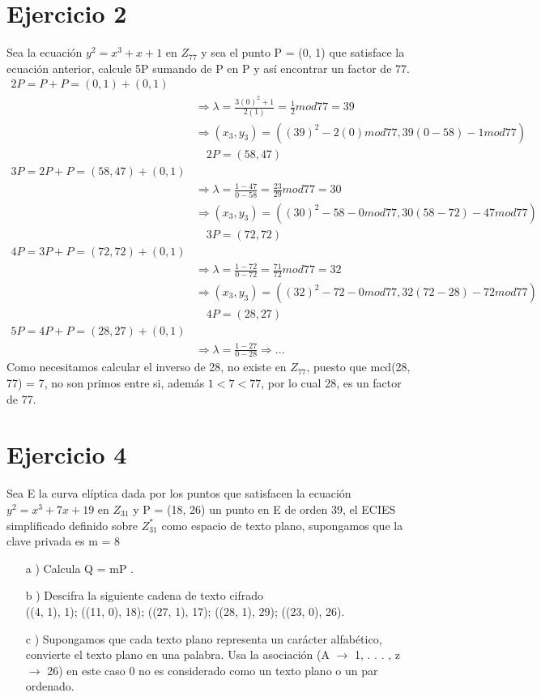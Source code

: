 \documentclass[12pt, letterpaper]{article}
\begin{document}
\section*{Ejercicio 2}
Sea la ecuación $y^2 = x^3 + x + 1$ en $Z_{77}$ y sea el punto P = (0, 1) que satisface la ecuación anterior, calcule 5P sumando de P en P y así encontrar un factor de 77.
\begin{equation*}
\begin{split}
2P = P + P = (0, 1) + (0, 1)\\
&\Rightarrow \lambda = \frac{3(0)^2 + 1}{2(1)} = \frac{1}{2} mod 77 = 39\\
&\Rightarrow (x_3, y_3) = ((39)^2-2(0) mod 77, 39(0-58)-1 mod 77)\\
&\quad 2P = (58, 47)\\
3P = 2P + P = (58, 47) + (0, 1)\\
&\Rightarrow \lambda = \frac{1-47}{0-58} = \frac{23}{29} mod 77 = 30\\
&\Rightarrow (x_3, y_3) = ((30)^2-58-0 mod 77, 30(58-72)-47 mod 77)\\
&\quad 3P = (72, 72)\\
4P = 3P + P = (72, 72) + (0, 1)\\
&\Rightarrow \lambda = \frac{1-72}{0-72} = \frac{71}{72} mod 77 = 32\\
&\Rightarrow (x_3, y_3) = ((32)^2-72-0 mod 77, 32(72-28)-72 mod 77)\\
&\quad 4P = (28, 27)\\
5P = 4P + P = (28, 27) + (0, 1)\\
&\Rightarrow \lambda = \frac{1-27}{0-28} \Rightarrow ...
\end{split}
\end{equation*}
Como necesitamos calcular el inverso de 28, no existe en $Z_{77}$, puesto que mcd(28, 77) = 7, no son primos entre si, además $1 < 7 < 77$, por lo cual 28, es un factor de 77.


\section*{Ejercicio 4}
Sea E la curva elíptica dada por los puntos que satisfacen la ecuación $y^2 = x^3 + 7x + 19$ en $Z_{31}$ y P = (18, 26) un punto en E de orden 39, el ECIES simplificado definido sobre $Z^*_{31}$ como espacio de texto plano, supongamos que la clave privada es m = 8
\begin{itemize}
\item[a ) ] Calcula Q = mP .
\item[b ) ] Descifra la siguiente cadena de texto cifrado\\
((4, 1), 1); ((11, 0), 18); ((27, 1), 17); ((28, 1), 29); ((23, 0), 26).
\item[c ) ]  Supongamos que cada texto plano representa un carácter alfabético, convierte el texto plano en una palabra. Usa la asociación (A $\rightarrow$ 1, . . . , z $\rightarrow$ 26) en este caso 0 no es considerado como un texto plano o un par ordenado.

\end{itemize}
\end{document}
